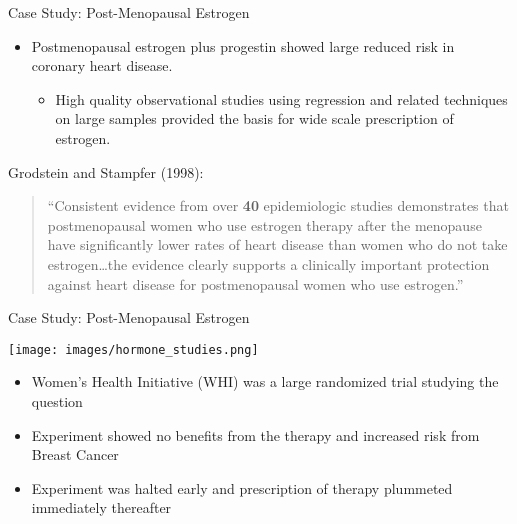 \documentclass{beamer}
\numberwithin{equation}{section}
\begin{document}
\begin{frame}{Case Study: Post-Menopausal Estrogen}

\begin{itemize}
\itemsep1pt\parskip0pt
\item
  Postmenopausal estrogen plus progestin showed large reduced risk in
  coronary heart disease.

  \begin{itemize}
  \itemsep1pt\parskip0pt
  \item
    High quality observational studies using regression and related
    techniques on large samples provided the basis for wide scale
    prescription of estrogen.
  \end{itemize}
\end{itemize}

\pause

Grodstein and Stampfer (1998):

\begin{quote}
``Consistent evidence from over \textbf{40} epidemiologic studies
demonstrates that postmenopausal women who use estrogen therapy after
the menopause have significantly lower rates of heart disease than women
who do not take estrogen\ldots{}the evidence clearly supports a
clinically important protection against heart disease for postmenopausal
women who use estrogen.''
\end{quote}

\end{frame}

\begin{frame}{Case Study: Post-Menopausal Estrogen}

\texttt{[image: images/hormone\_studies.png]}
\scriptsize \medskip
\begin{itemize}
\itemsep1pt\parskip0pt
\item
  Women's Health Initiative (WHI) was a large randomized trial studying
  the question\medskip
\item
  Experiment showed no benefits from the therapy and increased risk from
  Breast Cancer\medskip
\item
  Experiment was halted early and prescription of therapy plummeted
  immediately thereafter
\end{itemize}

\end{frame}
\end{document}
